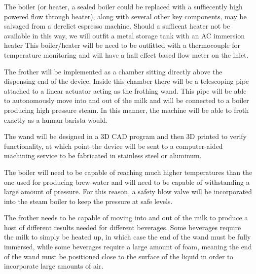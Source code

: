 \documentclass[conference]{IEEEtran}
\begin{document}

The boiler (or heater, a sealed boiler could be replaced with a suffiecently
high powered flow through heater), along with several other key components, may
be salvaged from a derelict espresso machine. Should a sufficent heater not be
available in this way, we will outfit a metal storage tank with an AC immersion
heater  This boiler/heater will be need to be outfitted with a thermocouple for
temperature monitoring and will have a hall effect based flow meter on the inlet.


The frother will be implemented as a chamber sitting directly above the
dispensing end of the device. Inside this chamber there will be a telescoping pipe
attached to a linear actuator acting as the frothing wand. This pipe will be
able to autonomously move into and out of the milk and will be connected to a boiler
producing high pressure steam. In this manner, the machine will be able to froth
exactly as a human barista would.

The wand will be designed in a 3D CAD program and then 3D printed to verify
functionality, at which point the device will be sent to a computer-aided
machining service to be fabricated in stainless steel or aluminum.

The boiler will need to be capable of reaching much higher temperatures than the
one used for producing brew water and will need to be capable of withstanding a
large amount of pressure. For this reason, a safety blow valve will be incorporated
into the steam boiler to keep the pressure at safe levels.


The frother needs to be capable of moving into and out of the milk to produce a host
of different results needed for different beverages. Some beverages require the milk
to simply be heated up, in which case the end of the wand must be fully immersed, while
some beverages require a large amount of foam, meaning the end of the wand must be positioned
close to the surface of the liquid in order to incorporate large amounts of air.
\end{document}
